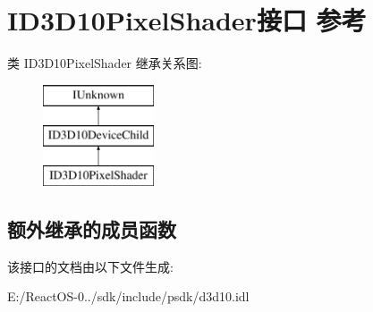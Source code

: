 \hypertarget{interface_i_d3_d10_pixel_shader}{}\section{I\+D3\+D10\+Pixel\+Shader接口 参考}
\label{interface_i_d3_d10_pixel_shader}
类 I\+D3\+D10\+Pixel\+Shader 继承关系图\+:\begin{figure}[H]
\begin{center}
\leavevmode
\includegraphics[height=3.000000cm]{interface_i_d3_d10_pixel_shader}
\end{center}
\end{figure}
\subsection*{额外继承的成员函数}


该接口的文档由以下文件生成\+:\begin{DoxyCompactItemize}
\item 
E\+:/\+React\+O\+S-\/0../sdk/include/psdk/d3d10.\+idl\end{DoxyCompactItemize}
